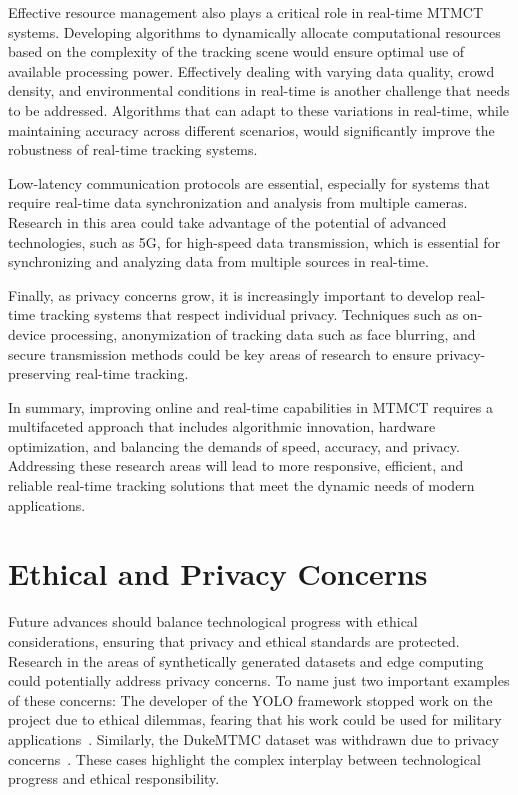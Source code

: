 Effective resource management also plays a critical role in real-time MTMCT systems. Developing algorithms to dynamically allocate computational resources based on the complexity of the tracking scene would ensure optimal use of available processing power. Effectively dealing with varying data quality, crowd density, and environmental conditions in real-time is another challenge that needs to be addressed. Algorithms that can adapt to these variations in real-time, while maintaining accuracy across different scenarios, would significantly improve the robustness of real-time tracking systems.

Low-latency communication protocols are essential, especially for systems that require real-time data synchronization and analysis from multiple cameras. Research in this area could take advantage of the potential of advanced technologies, such as 5G, for high-speed data transmission, which is essential for synchronizing and analyzing data from multiple sources in real-time.

Finally, as privacy concerns grow, it is increasingly important to develop real-time tracking systems that respect individual privacy. Techniques such as on-device processing, anonymization of tracking data such as face blurring, and secure transmission methods could be key areas of research to ensure privacy-preserving real-time tracking.

In summary, improving online and real-time capabilities in MTMCT requires a multifaceted approach that includes algorithmic innovation, hardware optimization, and balancing the demands of speed, accuracy, and privacy. Addressing these research areas will lead to more responsive, efficient, and reliable real-time tracking solutions that meet the dynamic needs of modern applications.

\section{Ethical and Privacy Concerns}\label{sec:ethical_and_privacy_concerns}
Future advances should balance technological progress with ethical considerations, ensuring that privacy and ethical standards are protected. Research in the areas of synthetically generated datasets and edge computing could potentially address privacy concerns. To name just two important examples of these concerns: The developer of the YOLO framework stopped work on the project due to ethical dilemmas, fearing that his work could be used for military applications~\cite{Synced20}. Similarly, the DukeMTMC dataset was withdrawn due to privacy concerns~\cite{Harvey21}. These cases highlight the complex interplay between technological progress and ethical responsibility.